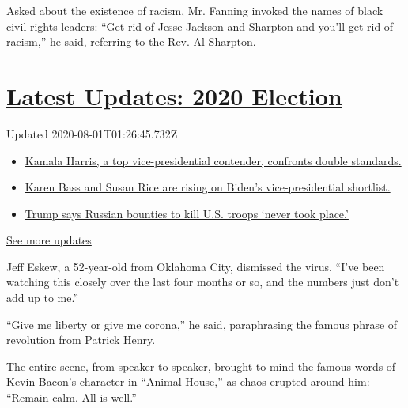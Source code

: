 Asked about the existence of racism, Mr. Fanning invoked the names of
black civil rights leaders: ``Get rid of Jesse Jackson and Sharpton and
you'll get rid of racism,'' he said, referring to the Rev. Al Sharpton.

\hypertarget{latest-updates-2020-election}{%
\section{\texorpdfstring{\href{https://www.nytimes.com/2020/07/31/us/elections/biden-vs-trump.html?action=click\&pgtype=Article\&state=default\&region=MAIN_CONTENT_1\&context=storylines_live_updates}{Latest
Updates: 2020
Election}}{Latest Updates: 2020 Election}}\label{latest-updates-2020-election}}

Updated 2020-08-01T01:26:45.732Z

\begin{itemize}
\tightlist
\item
  \href{https://www.nytimes.com/2020/07/31/us/elections/biden-vs-trump.html?action=click\&pgtype=Article\&state=default\&region=MAIN_CONTENT_1\&context=storylines_live_updates\#link-29fdff45}{Kamala
  Harris, a top vice-presidential contender, confronts double
  standards.}
\item
  \href{https://www.nytimes.com/2020/07/31/us/elections/biden-vs-trump.html?action=click\&pgtype=Article\&state=default\&region=MAIN_CONTENT_1\&context=storylines_live_updates\#link-13ec3d9c}{Karen
  Bass and Susan Rice are rising on Biden's vice-presidential
  shortlist.}
\item
  \href{https://www.nytimes.com/2020/07/31/us/elections/biden-vs-trump.html?action=click\&pgtype=Article\&state=default\&region=MAIN_CONTENT_1\&context=storylines_live_updates\#link-49e9a016}{Trump
  says Russian bounties to kill U.S. troops `never took place.'}
\end{itemize}

\href{https://www.nytimes.com/2020/07/31/us/elections/biden-vs-trump.html?action=click\&pgtype=Article\&state=default\&region=MAIN_CONTENT_1\&context=storylines_live_updates}{See
more updates}

Jeff Eskew, a 52-year-old from Oklahoma City, dismissed the virus.
``I've been watching this closely over the last four months or so, and
the numbers just don't add up to me.''

``Give me liberty or give me corona,'' he said, paraphrasing the famous
phrase of revolution from Patrick Henry.

The entire scene, from speaker to speaker, brought to mind the famous
words of Kevin Bacon's character in ``Animal House,'' as chaos erupted
around him: ``Remain calm. All is well.''

